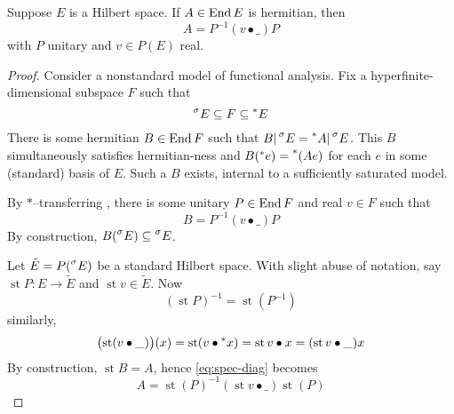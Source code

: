 \documentclass{scrartcl}
\newcommand{\hyper}[1]{\prescript{*}{}{#1}}
\newcommand{\standard}[1]{\prescript{\sigma}{}{#1}}
\DeclareMathOperator{\st}{st}
\begin{document}
\begin{theorem}
  Suppose $E$ is a Hilbert space. 
  If $A\in\operatorname{End} E$ is hermitian, then
  \[
    A = P^{-1}(v\bullet \_)P
  \]
  with $P$ unitary and $v\in P(E)$ real.
\end{theorem}
\begin{proof}
  Consider a nonstandard model of functional analysis. 
  Fix a hyperfinite-dimensional subspace $F$ such that
  \[
    \standard E \subseteq F \subseteq \hyper E
  \]
  There is some hermitian $B\in\operatorname{End} F$ such that $B|\standard E = \hyper A|\standard E$. This $B$ simultaneously satisfies hermitian-ness and $B(\hyper e)=\hyper(Ae)$ for each $e$ in some (standard) basis of $E$. Such a $B$ exists, internal to a sufficiently saturated model.

  By $*$--transferring , there is some unitary $P\in\operatorname{End} F$ and real $v\in F$ such that
  \begin{equation}
    B = P^{-1}(v\bullet\_)P
    \label{eq:spec-diag}
  \end{equation}
  By construction, $B(\standard E) \subseteq \standard E$.

  Let $\tilde E= P(\standard E)$ be a standard Hilbert space. With slight abuse of notation, say $\st P: E \to \tilde E$ and $\st v \in \tilde E$. 
  Now
  \[
    (\st P)^{-1}=\st(P^{-1})
  \]
  similarly,
  \[
    \bigl(\st(v\bullet\_)\bigr)(x)=\st(v\bullet\hyper x) = \st v\bullet x = (\st v\bullet\_)x
  \]
  By construction, $\st B=A$, hence \cref{eq:spec-diag} becomes
  \[
    A=\st(P)^{-1} (\st v\bullet\_) \st(P)
  \]
\end{proof}
\end{document}
